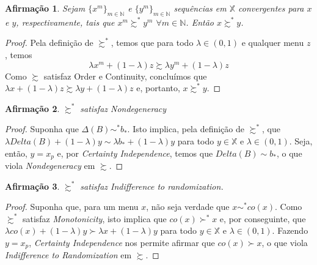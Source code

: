 \documentclass[11pt, a4paper]{article}
\theoremstyle{nonumberplain}
\newtheorem{proof}{Dem.}
\theoremstyle{plain}
\newtheorem{claim}{Afirmação}
\theoremstyle{plain}
\begin{document}
\begin{claim} Sejam $\{x^m\}_{m\in\mathbb{N}}$ e $\{y^m\}_{m\in\mathbb{N}}$ sequências em $\mathbb{X}$ convergentes para $x$ e $y$, respectivamente, tais que $x^m\succsim^* y^m$ $\forall m\in \mathbb{N}$. Então $x\succsim^* y$.\end{claim}
\begin{proof}
Pela definição de $\succsim^*$, temos que para todo $\lambda\in (0,1)$ e qualquer menu $z$, temos $$\lambda x^m + (1-\lambda)z \succsim \lambda y^m + (1-\lambda)z$$ Como $\succsim$ satisfaz Order e Continuity, concluímos que $\lambda x + (1-\lambda)z \succsim \lambda y + (1-\lambda)z$ e, portanto, $x\succsim^* y$.
\end{proof}

\begin{claim}$\succsim^*$ satisfaz \emph{Nondegeneracy}\end{claim}
\begin{proof}
Suponha que $\Delta(B)\sim^* b_*$. Isto implica, pela definição de $\succsim^*$, que $\lambda Delta(B)+(1-\lambda)y \sim \lambda b_*+(1-\lambda)y$ para todo $y \in \mathbb{X}$ e $\lambda \in (0,1)$. Seja, então, $y=x_p$ e, por \emph{Certainty Independence}, temos que $Delta(B)\sim b_*$, o que viola \emph{Nondegeneracy} em $\succsim$.
\end{proof}

\begin{claim}$\succsim^*$ satisfaz \emph{Indifference to randomization}.\end{claim}
\begin{proof}
Suponha que, para um menu $x$, não seja verdade que $x\sim^* co(x)$. Como $\succsim^*$ satisfaz \emph{Monotonicity}, isto implica que $co(x)\succ^* x$ e, por conseguinte, que $\lambda co(x)+(1-\lambda)y \succ \lambda x+(1-\lambda)y$ para todo $y \in \mathbb{X}$ e $\lambda \in (0,1)$. Fazendo $y=x_p$, \emph{Certainty Independence} nos permite afirmar que $co(x)\succ x$, o que viola \emph{Indifference to Randomization} em $\succsim$.  
\end{proof}

\end{document}
